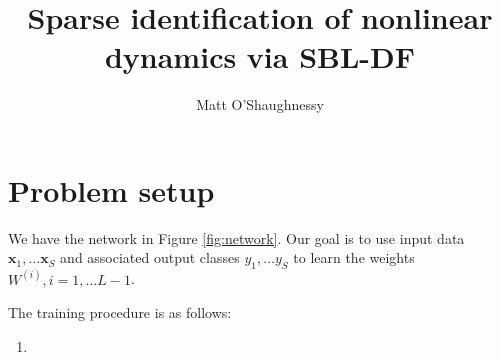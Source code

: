 \documentclass{article}
\title{Sparse identification of nonlinear dynamics via SBL-DF}
\author{Matt O'Shaughnessy}
\def\x{\bm{x}}
\begin{document}
	
	
	
	\maketitle
	
	\section{Problem setup}
	
	We have the network in Figure \ref{fig:network}. Our goal is to use input data $\x_1, \dots \x_S$ and associated output classes $y_1, \dots y_S$ to learn the weights $W^{(i)}, i = 1, \dots L-1$.
	
	The training procedure is as follows:
	\begin{enumerate}
		\item 
	\end{enumerate}
	
\end{document}
